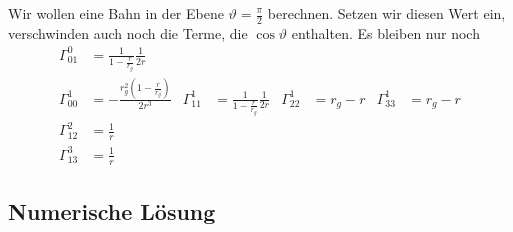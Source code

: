Wir wollen eine Bahn in der Ebene $\vartheta=\frac{\pi}2$ berechnen.
Setzen wir diesen Wert ein, verschwinden auch noch die Terme, die
$\cos\vartheta$ enthalten.
Es bleiben nur noch
\begin{align*}
\Gamma^0_{01}
&=
\frac{1}{1-\frac{r}{r_g}}
\frac{1}{2r}
\\
\Gamma^1_{00}
&=
-\frac{
r_g^2(1-\frac{r}{r_g})
}{2r^3}
&
\Gamma^1_{11}
&=
\frac1{1-\frac{r}{r_g}}\frac{1}{2r}
&
\Gamma^1_{22}
&=
r_g-r
&
\Gamma^1_{33}
&=
r_g-r
\\
\Gamma^2_{12}
&=
\frac1r
\\
\Gamma^3_{13}
&=
\frac1r
\end{align*}

\subsection{Numerische Lösung}




